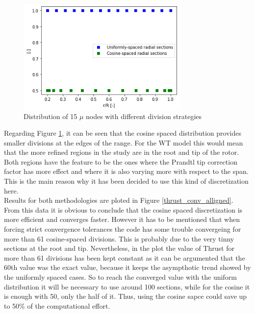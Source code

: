 \begin{figure}[htbp]
\includegraphics[width=0.75\textwidth]{./img/ex_cos_plt.png}
\caption{Distribution of 15 $\mu$ nodes with different division strategies }
\centering
\label{mu_nodes}
\end{figure}

Regarding Figure \ref{mu_nodes}, it can be seen that the cosine spaced distribution provides smaller divisions at the edges of the range. For the WT model this would mean that the more refined regions in the study are in the root and tip of the rotor. Both regions have the feature to be the ones where the Prandtl tip correction factor has more effect and where it is also varying more with respect to the span. This is the main reason why it has been decided to use this kind of discretization here. \\

Results for both methodologies are ploted in Figure \ref{thrust_conv_alligned}. From this data it is obvious to conclude that the cosine spaced discretization is more efficient and converges faster. However it has to be mentioned that when forcing strict convergence tolerances the code has some trouble convergeing for more than 61 cosine-spaced divisions. This is probably due to the very tinny sections at the root and tip. Nevertheless, in the plot the value of Thrust for more than 61 divisions has been kept constant as it can be argumented that the 60th value was the exact value, because it keeps the asympthotic trend showed by the uniformly spaced cases. So to reach the converged value with the uniform distribution it will be necessary to use around 100 sections, while for the cosine it is enough with 50, only the half of it. Thus, using the cosine sapce could save up to 50$\%$ of the computational effort. 

